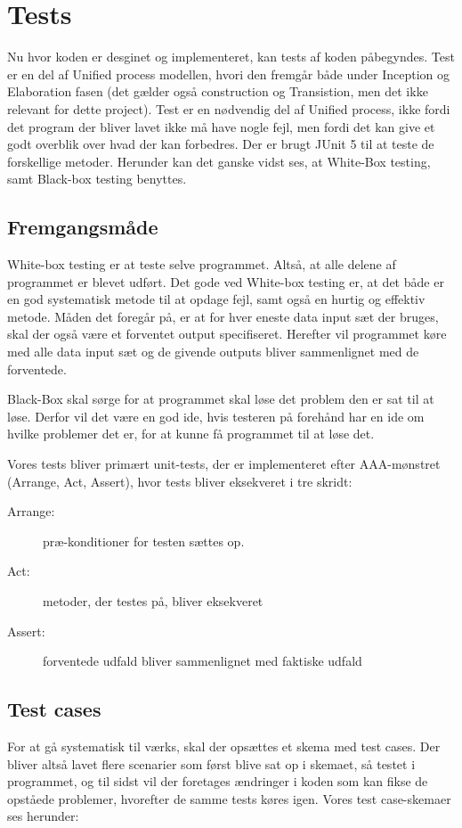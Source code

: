 \chapter{Tests}\label{ch:tests}
Nu hvor koden er desginet og implementeret, kan tests af koden påbegyndes. Test er en del af Unified process modellen, hvori den fremgår både under Inception og Elaboration fasen (det gælder også construction og Transistion, men det ikke relevant for dette project). Test er en nødvendig del af Unified process, ikke fordi det program der bliver lavet ikke må have nogle fejl, men fordi det kan give et godt overblik over hvad der kan forbedres\cite{sestoft2008systematic}. Der er brugt JUnit 5 til at teste de forskellige metoder. Herunder kan det ganske vidst ses, at White-Box testing, samt Black-box testing benyttes. 

\section{Fremgangsmåde}
White-box testing er at teste selve programmet. Altså, at alle delene af programmet er blevet udført. Det gode ved White-box testing er, at det både er en god systematisk metode til at opdage fejl, samt også en hurtig og effektiv metode. Måden det foregår på, er at for hver eneste data input sæt der bruges, skal der også være et forventet output specifiseret. Herefter vil programmet køre med alle data input sæt og de givende outputs bliver sammenlignet med de forventede\cite{sestoft2008systematic}.

Black-Box skal sørge for at programmet skal løse det problem den er sat til at løse. Derfor vil det være en god ide, hvis testeren på forehånd har en ide om hvilke problemer det er, for at kunne få programmet til at løse det\cite{sestoft2008systematic}. 

Vores tests bliver primært unit-tests, der er implementeret efter AAA-mønstret (Arrange, Act, Assert), hvor tests bliver eksekveret i tre skridt\cite{ArrangeActAssert}:
\begin{description}
    \item[Arrange:] præ-konditioner for testen sættes op.
    \item[Act:] metoder, der testes på, bliver eksekveret
    \item[Assert:] forventede udfald bliver sammenlignet med faktiske udfald 
\end{description}

\section{Test cases}
For at gå systematisk til værks, skal der opsættes et skema med test cases\cite{Heumann}. Der bliver altså lavet flere scenarier som først blive sat op i skemaet, så testet i programmet, og til sidst vil der foretages ændringer i koden som kan fikse de opståede problemer, hvorefter de samme tests køres igen. Vores test case-skemaer ses herunder:

